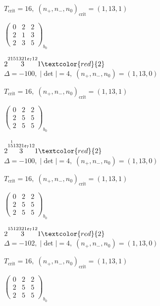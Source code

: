 \documentclass[10pt]{article}
\begin{document}
\hspace{1em}$T_{\text{crit}}=16,\; (n_+,n_-,n_0)_{\text{crit}}=(1,13,1)$

\hspace{2em}$\left(\begin{smallmatrix}0 & 2 & 2 \\ 2 & 1 & 3 \\ 2 & 3 & 5\end{smallmatrix}\right)_{\!b_0}$

\smallskip

$2\overset{2151321\mathfrak{e}_712}{3}1\textcolor{red}{2}$ \quad $\Delta=-100,\; |\det|=4,\; (n_+,n_-,n_0)=(1,13,0)$

\hspace{1em}$T_{\text{crit}}=16,\; (n_+,n_-,n_0)_{\text{crit}}=(1,13,1)$

\hspace{2em}$\left(\begin{smallmatrix}0 & 2 & 2 \\ 2 & 5 & 5 \\ 2 & 5 & 5\end{smallmatrix}\right)_{\!b_0}$

\smallskip

$2\overset{1\overset{1}{5}1321\mathfrak{e}_712}{3}1\textcolor{red}{2}$ \quad $\Delta=-100,\; |\det|=4,\; (n_+,n_-,n_0)=(1,13,0)$

\hspace{1em}$T_{\text{crit}}=16,\; (n_+,n_-,n_0)_{\text{crit}}=(1,13,1)$

\hspace{2em}$\left(\begin{smallmatrix}0 & 2 & 2 \\ 2 & 5 & 5 \\ 2 & 5 & 5\end{smallmatrix}\right)_{\!b_0}$

\smallskip

$2\overset{1512321\mathfrak{e}_712}{3}1\textcolor{red}{2}$ \quad $\Delta=-102,\; |\det|=4,\; (n_+,n_-,n_0)=(1,13,0)$

\hspace{1em}$T_{\text{crit}}=16,\; (n_+,n_-,n_0)_{\text{crit}}=(1,13,1)$

\hspace{2em}$\left(\begin{smallmatrix}0 & 2 & 2 \\ 2 & 5 & 5 \\ 2 & 5 & 5\end{smallmatrix}\right)_{\!b_0}$
\end{document}
